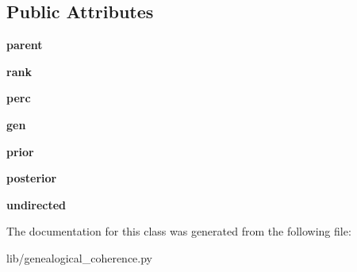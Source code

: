\subsection*{Public Attributes}
\begin{DoxyCompactItemize}
\item 
\mbox{\label{classCBGM_1_1lib_1_1genealogical__coherence_1_1ParentCombination_a06fcac22dc79f71577a4114c768e0650}} 
{\bfseries parent}
\item 
\mbox{\label{classCBGM_1_1lib_1_1genealogical__coherence_1_1ParentCombination_a7463c4c0541a1e274814997c408aa2f8}} 
{\bfseries rank}
\item 
\mbox{\label{classCBGM_1_1lib_1_1genealogical__coherence_1_1ParentCombination_a1025008260cd678e36be274ada4a40e5}} 
{\bfseries perc}
\item 
\mbox{\label{classCBGM_1_1lib_1_1genealogical__coherence_1_1ParentCombination_a98a1a9a20aa05d5ad8489eb84513b5ea}} 
{\bfseries gen}
\item 
\mbox{\label{classCBGM_1_1lib_1_1genealogical__coherence_1_1ParentCombination_a0a79c415819f6097eaf906422bac3f13}} 
{\bfseries prior}
\item 
\mbox{\label{classCBGM_1_1lib_1_1genealogical__coherence_1_1ParentCombination_a7a6bdf5ad97a8bad4ff3a2d78e689cf0}} 
{\bfseries posterior}
\item 
\mbox{\label{classCBGM_1_1lib_1_1genealogical__coherence_1_1ParentCombination_a9b8e8ba79e16c5c26e5801ee296ada3a}} 
{\bfseries undirected}
\end{DoxyCompactItemize}


The documentation for this class was generated from the following file\+:\begin{DoxyCompactItemize}
\item 
lib/genealogical\+\_\+coherence.\+py\end{DoxyCompactItemize}
